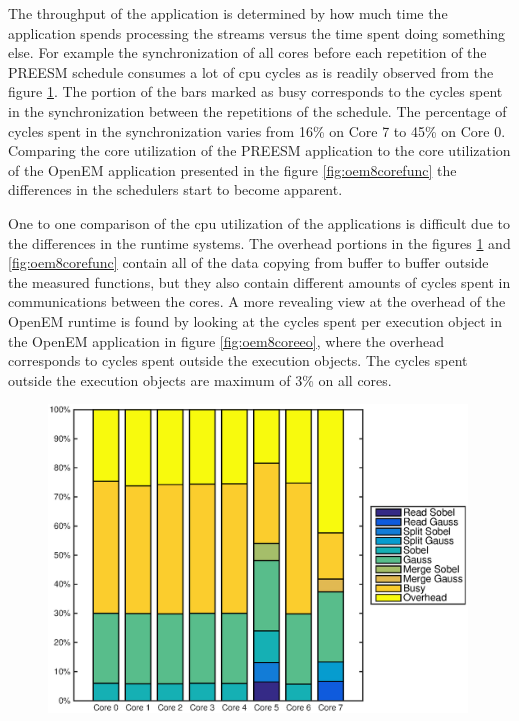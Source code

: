 The throughput of the application is determined by how much time the application
spends processing the streams versus the time spent doing something else. For
example the synchronization of all cores before each repetition of the PREESM
schedule consumes a lot of cpu cycles as is readily observed from the figure
\ref{fig:preesmcif}. The portion of the bars marked as busy corresponds to the
cycles spent in the synchronization between the repetitions of the schedule. The
percentage of cycles spent in the synchronization varies from 16\% on Core 7
to 45\% on Core 0. Comparing the core utilization of the PREESM application to
the core utilization of the OpenEM application presented in the figure
\ref{fig:oem8corefunc} the differences in the schedulers start to become apparent.

One to one comparison of the cpu utilization of the applications is difficult
due to the differences in the runtime systems. The overhead portions in the
figures \ref{fig:preesmcif} and \ref{fig:oem8corefunc} contain all of the data
copying from buffer to buffer outside the measured functions, but they also
contain different amounts of cycles spent in communications between the cores. A
more revealing view at the overhead of the OpenEM runtime is found by looking at
the cycles spent per execution object in the OpenEM application in figure
\ref{fig:oem8coreeo}, where the overhead corresponds to cycles spent outside the
execution objects. The cycles spent outside the execution objects are maximum of
3\% on all cores.

\begin{figure}
    \begin{center}
        \includegraphics[width=0.99\textwidth]{images/preesm_cifcif.eps}
        \label{fig:preesmcif}
    \end{center}
\end{figure}

